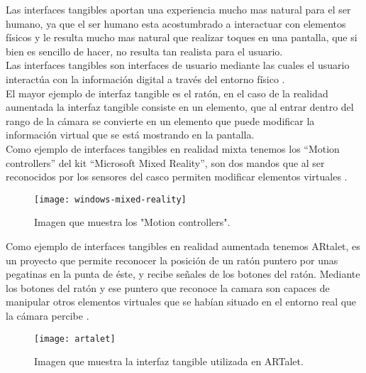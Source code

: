 Las interfaces tangibles aportan una experiencia mucho mas natural para el ser humano, ya que el ser humano esta acostumbrado a interactuar con elementos físicos y le resulta mucho mas natural que realizar toques en una pantalla, que si bien es sencillo de hacer, no resulta tan realista para el usuario.\\

Las interfaces tangibles son interfaces de usuario mediante las cuales el usuario interactúa con la información digital a través del entorno físico \cite{ullmer}.\\

El mayor ejemplo de interfaz tangible es el ratón, en el caso de la realidad aumentada la interfaz tangible consiste en un elemento, que al entrar dentro del rango de la cámara se convierte en un elemento que puede modificar la información virtual que se está mostrando en la pantalla.\\

Como ejemplo de interfaces tangibles en realidad mixta tenemos los “Motion controllers” del kit “Microsoft Mixed Reality”, son dos mandos que al ser reconocidos por los sensores del casco permiten modificar elementos virtuales \cite{windows-mixed-reality}.\\

\begin{figure}[h]
  \centering
  \texttt{[image: windows-mixed-reality]}
  \caption{Imagen que muestra los "Motion controllers".\protect\footnotemark}
  \label{figura-windowsmixedreality}
\end{figure}



Como ejemplo de interfaces tangibles en realidad aumentada tenemos ARtalet, es un proyecto que permite reconocer la posición de un ratón puntero por unas pegatinas en la punta de éste, y recibe señales de los botones del ratón. Mediante los botones del ratón y ese puntero que reconoce la camara son capaces de manipular otros elementos virtuales que se habían situado en el entorno real que la cámara percibe \cite{ha}.\\

\begin{figure}[h]
  \centering
  \texttt{[image: artalet]}
  \caption{Imagen que muestra la interfaz tangible utilizada en ARTalet.\protect\footnotemark}
  \label{figura-artalet}
\end{figure}

